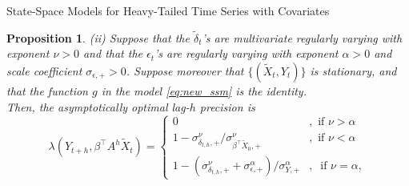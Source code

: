\documentclass{beamer}
\newtheorem{proposition}{Proposition}
\newtheorem{remark}{Remark}[section]
\begin{document}
\begin{frame}{State-Space Models for Heavy-Tailed Time Series with Covariates}
    \begin{proposition}
        {\em (ii)} Suppose that the $\tilde{\delta}_t$'s are multivariate regularly varying with exponent $\nu>0$ and that the $\epsilon_t$'s are regularly varying with exponent
        $\alpha>0$ and scale coefficient $\sigma_{\epsilon,+}>0$.  Suppose moreover that $\{ (\tilde X_t, Y_t)\}$ is stationary, and
        that the function $g$ in the model \eqref{eq:new_ssm} is the identity. \\
        
        Then, the asymptotically optimal lag-$h$ precision is
        \begin{equation*}
        \lambda(Y_{t+h}, \beta^\top A^h \tilde X_t) = \left\{ \begin{array}{ll} 
        0 &, \mbox{ if } \nu>\alpha\\
        1- \sigma_{\delta_{t,h},+}^\nu / \sigma_{\beta^\top \tilde X_{0},+}^\nu &, \mbox{ if } \nu < \alpha\\
        1- (\sigma_{\delta_{t,h},+}^\nu + \sigma_{\epsilon,+}^\alpha) / \sigma_{Y,+}^\alpha &,\ \mbox{ if } \nu = \alpha,
        \end{array}\right.
        \end{equation*}
    \end{proposition}
\end{frame}    


\end{document}
